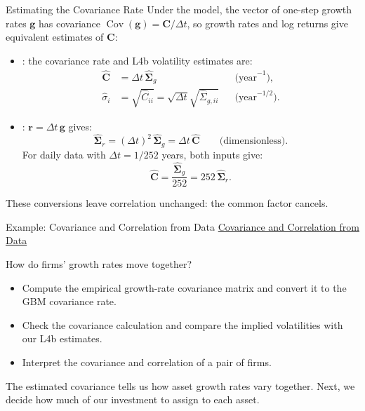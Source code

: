\documentclass[aspectratio=169,11pt]{beamer}
\newcommand{\Cov}{\operatorname{Cov}}
\newcommand{\bC}{\mathbf{C}}
\newcommand{\bg}{\mathbf{g}}
\newcommand{\Sg}{\hat{\boldsymbol{\Sigma}}_{g}}
\newcommand{\Ch}{\hat{\mathbf{C}}}
\begin{document}
\begin{frame}{Estimating the Covariance Rate}
  Under the model, the vector of one-step growth rates $\bg$ has covariance $\Cov(\bg)=\bC/\Delta t$,
  so growth rates and log returns give equivalent estimates of $\bC$:

  \vspace{0.4em}
  \begin{itemize}\setlength{\itemsep}{0.65em}
    \item {}: the covariance rate and L4b volatility estimates are:
      \[
        \begin{aligned}
          \Ch&=\Delta t\,\Sg
            &&\text{(year}^{-1}\text{)},\\[0.4em]
          \hat\sigma_i&=\sqrt{\hat C_{ii}}
            =\sqrt{\Delta t}\sqrt{\hat\Sigma_{g,ii}}
            &&\text{(year}^{-1/2}\text{)}.
        \end{aligned}
      \]
    \item {}: $\mathbf r=\Delta t\,\bg$ gives:
      \[
        \hat{\boldsymbol\Sigma}_r=(\Delta t)^2\,\Sg=\Delta t\,\Ch
        \qquad\text{(dimensionless).}
      \]
      For daily data with $\Delta t=1/252$ years, both inputs give:
      \[
        \Ch=\frac{\Sg}{252}=252\,\hat{\boldsymbol\Sigma}_r.
      \]
  \end{itemize}
  These conversions leave correlation unchanged: the common factor cancels.
\end{frame}

\begin{frame}{Example: Covariance and Correlation from Data}
\textbf{}
\href{https://github.com/varnerlab/CHEME-5660-CourseRepository-Fall-2026/blob/main/lectures/week-5/L5b/CHEME-5660-L5b-Example-CovarianceMatrix-Fall-2026.ipynb}{Covariance and Correlation from Data}

\vspace{0.8em}
How do firms' growth rates move together?

\vspace{0.6em}
\begin{itemize}\setlength{\itemsep}{0.6em}
  \item Compute the empirical growth-rate covariance matrix and convert it
    to the GBM covariance rate.
  \item Check the covariance calculation and compare the implied volatilities
    with our L4b estimates.
  \item Interpret the covariance and correlation of a pair of firms.
\end{itemize}

\vspace{0.7em}
The estimated covariance tells us how asset growth rates vary together.
Next, we decide how much of our investment to assign to each asset.
\end{frame}
\end{document}
